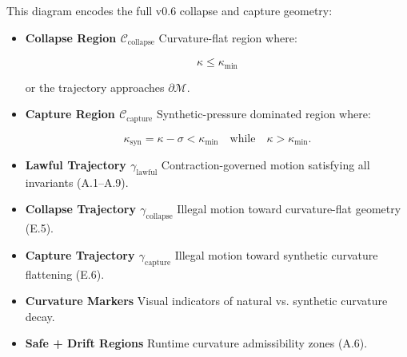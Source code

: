 
\medskip

\noindent
This diagram encodes the full v0.6 collapse and capture geometry:

\begin{itemize}
    \item \textbf{Collapse Region $\mathcal{C}_{\mathrm{collapse}}$}  
    Curvature-flat region where:
    

\[
    \kappa \le \kappa_{\min}
    \]


    or the trajectory approaches $\partial\mathcal{M}$.

    \item \textbf{Capture Region $\mathcal{C}_{\mathrm{capture}}$}  
    Synthetic-pressure dominated region where:
    

\[
    \kappa_{\mathrm{syn}} = \kappa - \sigma < \kappa_{\min}
    \quad\text{while}\quad
    \kappa > \kappa_{\min}.
    \]



    \item \textbf{Lawful Trajectory $\gamma_{\mathrm{lawful}}$}  
    Contraction-governed motion satisfying all invariants (A.1–A.9).

    \item \textbf{Collapse Trajectory $\gamma_{\mathrm{collapse}}$}  
    Illegal motion toward curvature-flat geometry (E.5).

    \item \textbf{Capture Trajectory $\gamma_{\mathrm{capture}}$}  
    Illegal motion toward synthetic curvature flattening (E.6).

    \item \textbf{Curvature Markers}  
    Visual indicators of natural vs. synthetic curvature decay.

    \item \textbf{Safe + Drift Regions}  
    Runtime curvature admissibility zones (A.6).
\end{itemize}

